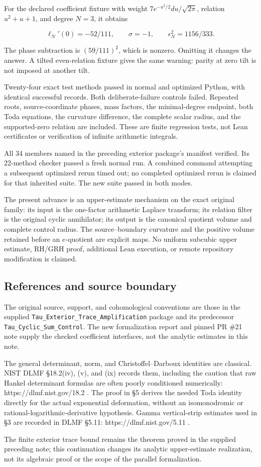 For the declared coefficient fixture with weight
\(7e^{-u^2/2}du/\sqrt{2\pi}\), relation \(u^2+u+1\), and degree \(N=3\),
it obtains

\[
\ell_N'(0)=-52/111,\qquad \sigma=-1,\qquad
\epsilon_N^2=1156/333.
\]

The phase subtraction is \((59/111)^2\), which is nonzero. Omitting it
changes the answer. A tilted even-relation fixture gives the same
warning: parity at zero tilt is not imposed at another tilt.

Twenty-four exact test methods passed in normal and optimized Python,
with identical successful records. Both deliberate-failure controls
failed. Repeated roots, source-coordinate phases, mass factors, the
minimal-degree endpoint, both Toda equations, the curvature difference,
the complete scalar radius, and the supported-zero relation are
included. These are finite regression tests, not Lean certificates or
verification of infinite arithmetic integrals.

All 34 members named in the preceding exterior package's manifest
verified. Its 22-method checker passed a fresh normal run. A combined
command attempting a subsequent optimized rerun timed out; no completed
optimized rerun is claimed for that inherited suite. The new suite
passed in both modes.

The present advance is an upper-estimate mechanism on the exact original
family: its input is the one-factor arithmetic Laplace transform; its
relation filter is the original cyclic annihilator; its output is the
canonical quotient volume and complete control radius. The
source--boundary curvature and the positive volume retained before an
\(e\)-quotient are explicit maps. No uniform subcubic upper estimate,
RH/GRH proof, additional Lean execution, or remote repository
modification is claimed.

\subsection{References and source
boundary}\label{toda_volume:references-and-source-boundary}

The original source, support, and cohomological conventions are those in
the supplied \nolinkurl{Tau_Exterior_Trace_Amplification} package and
its predecessor \nolinkurl{Tau_Cyclic_Sum_Control}. The new
formalization report and pinned PR \#21 note supply the checked
coefficient interfaces, not the analytic estimates in this note.

The general determinant, norm, and Christoffel--Darboux identities are
classical. NIST DLMF §18.2(iv), (v), and (ix) records them, including
the caution that raw Hankel determinant formulas are often poorly
conditioned numerically: https://dlmf.nist.gov/18.2 . The proof in §5
derives the needed Toda identity directly for the actual exponential
deformation, without an isomonodromic or rational-logarithmic-derivative
hypothesis. Gamma vertical-strip estimates used in §3 are recorded in
DLMF §5.11: https://dlmf.nist.gov/5.11 .

The finite exterior trace bound remains the theorem proved in the
supplied preceding note; this continuation changes its analytic
upper-estimate realization, not its algebraic proof or the scope of the
parallel formalization.

